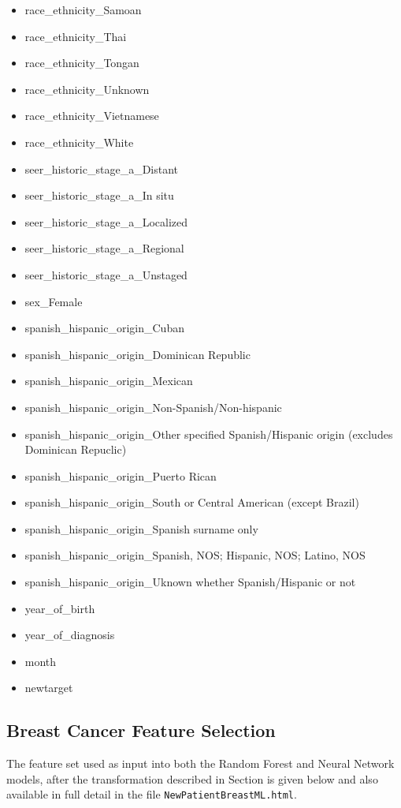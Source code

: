 \documentclass[a4paper,11pt]{article}
\newcommand{\codewhite}[1]{\colorbox{white}{\texttt{#1}}}
\begin{document}
\begin{itemize}[noitemsep]
\item race\_ethnicity\_Samoan
\item race\_ethnicity\_Thai
\item race\_ethnicity\_Tongan
\item race\_ethnicity\_Unknown
\item race\_ethnicity\_Vietnamese
\item race\_ethnicity\_White
\item seer\_historic\_stage\_a\_Distant
\item seer\_historic\_stage\_a\_In situ
\item seer\_historic\_stage\_a\_Localized
\item seer\_historic\_stage\_a\_Regional
\item seer\_historic\_stage\_a\_Unstaged
\item sex\_Female
\item spanish\_hispanic\_origin\_Cuban
\item spanish\_hispanic\_origin\_Dominican Republic
\item spanish\_hispanic\_origin\_Mexican
\item spanish\_hispanic\_origin\_Non-Spanish/Non-hispanic
\item spanish\_hispanic\_origin\_Other specified Spanish/Hispanic origin (excludes Dominican Repuclic)
\item spanish\_hispanic\_origin\_Puerto Rican
\item spanish\_hispanic\_origin\_South or Central American (except Brazil)
\item spanish\_hispanic\_origin\_Spanish surname only
\item spanish\_hispanic\_origin\_Spanish, NOS; Hispanic, NOS; Latino, NOS
\item spanish\_hispanic\_origin\_Uknown whether Spanish/Hispanic or not
\item year\_of\_birth
\item year\_of\_diagnosis
\item month
\item newtarget
\end{itemize}


\subsection{Breast Cancer Feature Selection}
\label{subsec:breastfeatures}

The feature set used as input into both the Random Forest and Neural Network models, after the transformation described in Section is given below and also available in full detail in the file 
\codewhite{NewPatientBreastML.html}.
\end{document}
